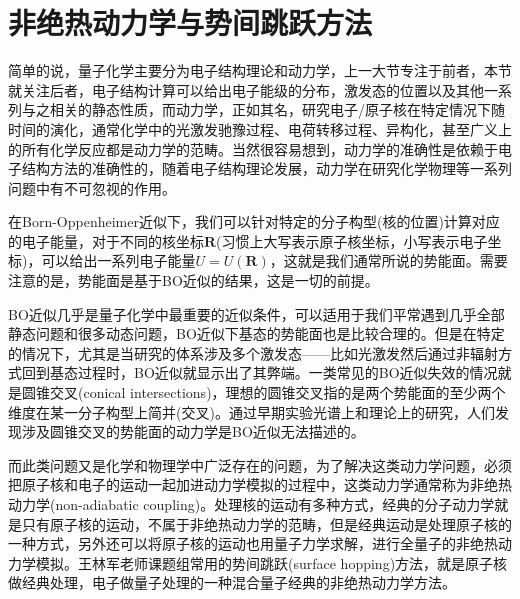 \documentclass[12pt,a4paper,openany,twoside]{book}
\numberwithin{equation}{section}
\begin{document}
  \chapter{非绝热动力学与势间跳跃方法}
    简单的说，量子化学主要分为电子结构理论和动力学，上一大节专注于前者，本节就关注后者，电子结构计算可以给出电子能级的分布，激发态的位置以及其他一系列与之相关的静态性质，而动力学，正如其名，研究电子/原子核在特定情况下随时间的演化，通常化学中的光激发驰豫过程、电荷转移过程、异构化，甚至广义上的所有化学反应都是动力学的范畴。当然很容易想到，动力学的准确性是依赖于电子结构方法的准确性的，随着电子结构理论发展，动力学在研究化学物理等一系列问题中有不可忽视的作用。

    在Born-Oppenheimer近似下，我们可以针对特定的分子构型(核的位置)计算对应的电子能量，对于不同的核坐标$\mathbf{R}$(习惯上大写表示原子核坐标，小写表示电子坐标)，可以给出一系列电子能量$U=U(\mathbf{R})$，这就是我们通常所说的势能面。需要注意的是，势能面是基于BO近似的结果，这是一切的前提。
    
    BO近似几乎是量子化学中最重要的近似条件，可以适用于我们平常遇到几乎全部静态问题和很多动态问题，BO近似下基态的势能面也是比较合理的。但是在特定的情况下，尤其是当研究的体系涉及多个激发态——比如光激发然后通过非辐射方式回到基态过程时，BO近似就显示出了其弊端。一类常见的BO近似失效的情况就是圆锥交叉(conical intersections)，理想的圆锥交叉指的是两个势能面的至少两个维度在某一分子构型上简并(交叉)。通过早期实验光谱上和理论上的研究，人们发现涉及圆锥交叉的势能面的动力学是BO近似无法描述的。
    
    而此类问题又是化学和物理学中广泛存在的问题，为了解决这类动力学问题，必须把原子核和电子的运动一起加进动力学模拟的过程中，这类动力学通常称为非绝热动力学(non-adiabatic coupling)。处理核的运动有多种方式，经典的分子动力学就是只有原子核的运动，不属于非绝热动力学的范畴，但是经典运动是处理原子核的一种方式，另外还可以将原子核的运动也用量子力学求解，进行全量子的非绝热动力学模拟。王林军老师课题组常用的势间跳跃(surface hopping)方法，就是原子核做经典处理，电子做量子处理的一种混合量子经典的非绝热动力学方法。
\end{document}
